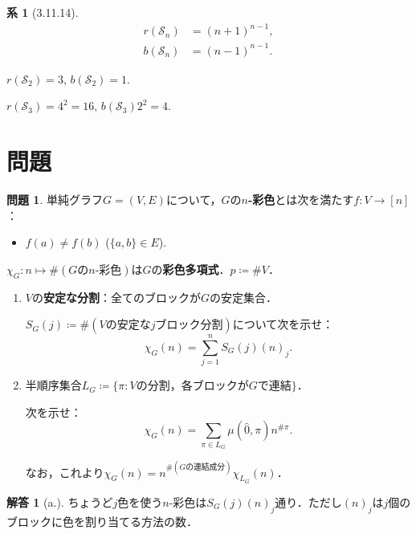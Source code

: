 \documentclass[xelatex,ja=standard,a4paper,14pt,everyparhook=compat]{bxjsarticle}
\newcommand{\mcS}{\mathcal{S}}
\theoremstyle{definition}
\newtheorem*{corollary}{系}
\newtheorem{problem}{問題}
\newtheorem*{answer}{解答}
\begin{document}
\begin{corollary}[3.11.14]
    \begin{align*}
        r(\mcS_n) & = (n+1)^{n-1}, \\
        b(\mcS_n) & = (n-1)^{n-1}.
    \end{align*}
\end{corollary}

$r(\mcS_2) = 3$, $b(\mcS_2) = 1$.

$r(\mcS_3) = 4^2 = 16$, $b(\mcS_3) 2^2 = 4$.

\newpage

\section{問題}

\setcounter{problem}{107}
\begin{problem}
    単純グラフ$G = (V,E)$について，$G$の\textbf{$n$-彩色}とは次を満たす$f: V \to [n]$： \begin{itemize}
        \item $f(a) \neq f(b)$ ($\{a,b\} \in E$).
    \end{itemize}
    $\chi_G: n \mapsto \#(\text{$G$の$n$-彩色})$は$G$の\textbf{彩色多項式}．$p \coloneqq \#V$．

    \begin{enumerate}[label=\alph*.]
        \item $V$の\textbf{安定な分割}：全てのブロックが$G$の安定集合．

        $S_G(j) \coloneqq \#(\text{$V$の安定な$j$ブロック分割})$について次を示せ： \begin{equation*}
            \chi_G(n) = \sum_{j=1}^n S_G(j) (n)_j.
        \end{equation*}
        \item 半順序集合$L_G \coloneqq \{\pi : \text{$V$の分割，各ブロックが$G$で連結}\}$．

        次を示せ： \begin{equation*}
            \chi_G(n) = \sum_{\pi \in L_G} \mu(\hat0, \pi) n^{\#\pi}.
        \end{equation*}

        なお，これより$\chi_G(n) = n^{\#(\text{$G$の連結成分})} \chi_{L_G}(n)$．
    \end{enumerate}
\end{problem}
\begin{answer}[a.]
    ちょうど$j$色を使う$n$-彩色は$S_G(j) (n)_j$通り．ただし$(n)_j$は$j$個のブロックに色を割り当てる方法の数．
\end{answer}
\end{document}
